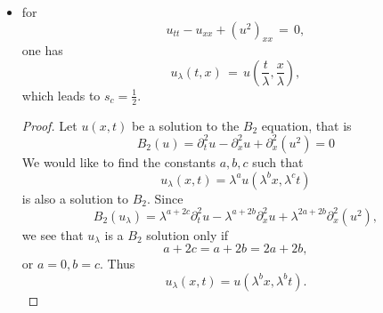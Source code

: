 \documentclass[12pt,reqno]{amsart}
\numberwithin{equation}{section}  %
\newcommand{\rr}{\mathbb{R}}
\newcommand{\ci}{\mathbb{T}}
\newcommand{\wh}{\widehat}
\newtheorem{remark}[theorem]{Remark}
\begin{document}
\begin{appendices}
\begin{itemize}
\begin{proof}
\begin{equation*}
\begin{split}
  \| u_{\lambda} \|_{\dot{H}^s(\rr)} 
  & = \lambda^{2} \left( \int_{\rr} | \xi |^{2s} |
  \frac{1}{\lambda}\wh{u(\cdot, \lambda^{2}t)}(\frac{\xi}{\lambda}) |^2 d \xi
  \right)^{1/2}
  \\
  & = \lambda \left( \int_{\rr}| \xi |^{2s} | \wh{u(\cdot,
  \lambda^{2}t)}(\frac{\xi}{\lambda}) |^2 d \xi  \right)^{1/2}
  \\
  & = \lambda \left( \int_{\rr} | \lambda \xi' |^{2s} 
  \wh{u(\cdot, \lambda^{2}t)}(\xi') |^2 \lambda d \xi
  \right)^{1/2}
  \\
  & = \lambda^{s + 3/2} \|u(\cdot, \lambda^{2}t) \|_{\dot{H}^s (\ci)}.
\end{split}
\end{equation*}
%
%
Therefore, $\| u_{\lambda(0)} \|_{\dot{H}^s(\rr)} = \lambda^{s + 3/2} \|
u_{0} \|_{\dot{H}^{s}(\rr)}$. Hence, $s=-3/2$ is the critical Sobolev index.
\end{proof}
%
%
\begin{framed}
\begin{remark}
Since the scaling conserves data in $\dot{H}^{-3/2}$, it
seems that this equation is ``like KdV''.
So one may expect KdV type theorems.
That is, $s_c=-3/4$ on the line and $s_c=-1/2$ on the circle,
if one uses bilinear estimates.
But, Kappeler and collaborators went all the way to $-1$ for KdV.
However KdV is integrable. Is this equation integrable?
Also, people conjecture that the critical index for KdV well-posedness 
in some appropriate sense should be the scaling index which is  $-3/2$.
\label{rem:kdv-like}
\end{remark}
\end{framed}
%
%
  \item for 
    \[
    u_{tt}-u_{xx}+(u^2)_{xx}\,=\,0,
    \]
    one has 
    \[
    u_{\lambda}(t,x)\,=\,u\left(\frac{t}{\lambda}, \frac{x}{\lambda}\right),
    \]
    which leads to $s_c=\frac 12$.
\begin{proof}
Let $u(x, t)$ be a solution to the $B_2$ equation, that is
%
$$
B_2(u)=
 \partial_t^2u - \partial^2_x u + \partial_x^2(u^2)  = 0
$$
%
We would like to find the constants
$a, b, c$ such that
\[
u_\lambda (x, t) = \lambda^a u(\lambda^b x, \lambda^c t)
\]
is also a solution to $B_2$.  Since 
$$
B_2(u_\lambda)=
\lambda^{a+2c} \partial_t^2u 
-
 \lambda^{a+2b} \partial^2_x u 
 +
  \lambda^{2a+2b}
  \partial_x^2(u^2),  
$$
we see that $u_\lambda$ is a $B_2$ solution only if
$$
a+2c=a+2b=2a+2b,
$$
or
$
a=0, b=c.
$
  Thus
\[
u_\lambda (x, t) = u(\lambda^{b}x,  \lambda^{b} t).
\]
\end{proof}
\end{itemize}
\end{appendices}
\end{document}
